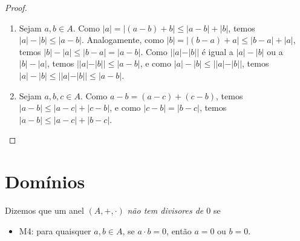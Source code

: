 \begin{proof}
\begin{enumerate}[leftmargin=*, align=left, label=\textbf{(\alph*)}]
                \begin{enumerate}[label=\roman*.]
                    \item Por um lado ($\Rightarrow$), suponha que $|a| \leq b$. Como $0 \leq |a| \leq b$, temos $b \geq 0$. Se $a \geq 0$, então $a = |a| \leq b$, e como $-b \leq 0 \leq a = |a| \leq b$, temos $-b \leq a \leq b$. Se $a < 0$, então $-a = |a| \leq b$, e como $a \leq 0 \leq b$ e $-b \leq a$, temos $-b \leq a \leq b$. Por outro lado ($\Leftarrow$), suponha que $-b \leq a \leq b$. Se $a \geq 0$, então $|a| = a \leq b$. Se $a < 0$, então $|a| = -a$, e como $-b \leq a$, temos $-a \leq b$, de modo que $|a| \leq b$.
                    \item Por um lado ($\Rightarrow$), suponha que $|a| \geq b$. Se $a \geq 0$, então $a = |a| \geq b$. Se $a < 0$, então $-a = |a| \geq b$, de modo que $a \leq -b$. Logo, $a \geq b$ ou $a \leq -b$. Por outro lado ($\Leftarrow$), suponha que $a \geq b$ ou $a \leq -b$. Se $a \geq b$, então, como $a \leq |a|$, temos $b \leq |a|$. Se $a \leq -b$, então $b \leq -a$, e como $-a \leq |-a| = |a|$, temos $b \leq |a|$.
                \end{enumerate}
            Logo, $|a| \leq b \Leftrightarrow -b \leq a \leq b$ e $|a| \geq b \Leftrightarrow a \geq b \lor a \leq -b$. \blackproof
            \item Sejam $a, b \in A$. Como $|a| = |(a-b)+b| \leq |a-b| + |b|$, temos $|a| - |b| \leq |a-b|$. Analogamente, como $|b| = |(b-a)+a| \leq |b-a| + |a|$, temos $|b| - |a| \leq |b-a| = |a-b|$. Como $||a|-|b||$ é igual a $|a|-|b|$ ou a $|b|-|a|$, temos $||a|-|b|| \leq |a-b|$, e como $|a|-|b| \leq ||a|-|b||$, temos $|a| - |b| \leq ||a|-|b|| \leq |a-b|$. \blackproof
            \item Sejam $a,b,c \in A$. Como $a-b = (a-c)+(c-b)$, temos $|a-b| \leq |a-c|+|c-b|$, e como $|c-b| = |b-c|$, temos $|a-b| \leq |a-c|+|b-c|$. \blackproof
        \end{enumerate}
\end{proof}

\section{Domínios}

\begin{definition}
    Dizemos que um anel $(A, +, \cdot)$ \emph{não tem divisores de $0$} se
        \begin{itemize}
            \item M4: para quaisquer $a, b \in A$, se $a \cdot b = 0$, então $a=0$ ou $b=0$.
        \end{itemize}
\end{definition}

